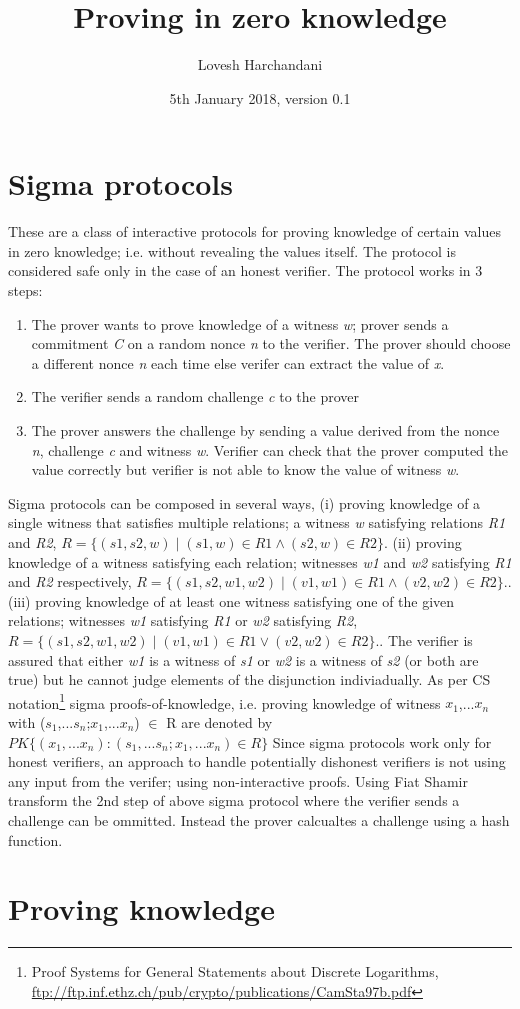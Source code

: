 \documentclass[a4paper]{article}
\title{Proving in zero knowledge}
\author{Lovesh Harchandani}
\date{5th January 2018, version 0.1}
\begin{document}
\maketitle

\section{Sigma protocols}
These are a class of interactive protocols for proving knowledge of certain values in zero knowledge; i.e. without revealing the values itself. The protocol is considered safe only in the case of an honest verifier. The protocol works in 3 steps:
\begin{enumerate}
  \item The prover wants to prove knowledge of a witness \emph{w}; prover sends a commitment \emph{C} on a random nonce \emph{n} to the verifier. The prover should choose a different nonce \emph{n} each time else verifer can extract the value of \emph{x}.
  \item The verifier sends a random challenge \emph{c} to the prover
  \item The prover answers the challenge by sending a value derived from the nonce \emph{n}, challenge \emph{c} and witness \emph{w}.  Verifier can check that the prover computed the value correctly but verifier is not able to know the value of witness \emph{w}.
\end{enumerate}
Sigma protocols can be composed in several ways, (i) proving knowledge of a single witness that satisfies multiple relations; a witness \textit{w} satisfying relations \textit{R1} and \textit{R2}, $ R=\{(s1,s2,w) \mid (s1,w) \in R1 \land (s2,w) \in R2\} $. (ii) proving knowledge of a witness satisfying each relation; witnesses \textit{w1} and \textit{w2} satisfying \textit{R1} and \textit{R2} respectively, $ R=\{(s1,s2,w1,w2) \mid (v1,w1) \in R1 \land (v2,w2) \in R2\}. $. (iii) proving knowledge of at least one witness satisfying one of the given relations; witnesses \textit{w1} satisfying \textit{R1}  or \textit{w2} satisfying \textit{R2}, $ R=\{(s1,s2,w1,w2) \mid (v1,w1) \in R1 \lor (v2,w2) \in R2\}. $. The verifier is assured that either \textit{w1} is a witness of \textit{s1} or \textit{w2} is a witness of \textit{s2} (or both are true) but he cannot judge elements of the disjunction indiviadually. 
As per CS notation\footnote{Proof Systems for General Statements about Discrete Logarithms, \url{ftp://ftp.inf.ethz.ch/pub/crypto/publications/CamSta97b.pdf}} sigma proofs-of-knowledge, i.e. proving knowledge of witness $x_1$,...$x_n$ with ($s_1$,...$s_n$;$x_1$,...$x_n$) $\in$ R are denoted by $ PK\{(x_1,...x_n) : (s_1,...s_n;x_1,...x_n) \in R\} $
\newline
Since sigma protocols work only for honest verifiers, an approach to handle potentially dishonest verifiers is not using any input from the verifer; using  non-interactive proofs. Using Fiat Shamir transform the 2nd step of above sigma protocol where the verifier sends a challenge can be ommitted. Instead the prover calcualtes a challenge using a hash function.
\section{Proving knowledge}
\end{document}
